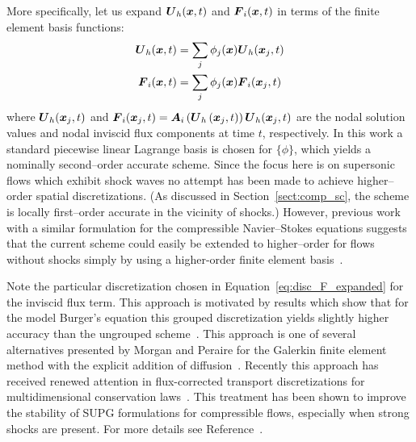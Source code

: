More specifically, let us expand ${\boldsymbol{U}}_h({\boldsymbol{x}},t)$ and ${\boldsymbol{F}}_i({\boldsymbol{x}},t)$ in terms of the finite element basis functions:
\begin{align}
  {\boldsymbol{U}}_h  ({\boldsymbol{x}},t) &= \sum_j \phi_j({\boldsymbol{x}}) {\boldsymbol{U}}_h({\boldsymbol{x}}_j,t)   \label{eq:disc_U_expanded} \\
  {\boldsymbol{F}}_i({\boldsymbol{x}},t) &= \sum_j \phi_j({\boldsymbol{x}}) {\boldsymbol{F}}_i({\boldsymbol{x}}_j,t) \label{eq:disc_F_expanded}
\end{align}
where ${\boldsymbol{U}}_h({\boldsymbol{x}}_j,t)$ and ${\boldsymbol{F}}_i({\boldsymbol{x}}_j,t)={\boldsymbol{A}}_i\left({\boldsymbol{U}}_h\left({\boldsymbol{x}}_j,t\right)\right){\boldsymbol{U}}_h({\boldsymbol{x}}_j,t)$ are the nodal solution values and nodal inviscid flux components at time $t$, respectively. In this work a standard piecewise linear Lagrange basis is chosen for $\{\phi\}$, which yields a nominally second--order accurate scheme.  Since the focus here is on supersonic flows which exhibit shock waves no attempt has been made to achieve higher--order spatial discretizations. (As discussed in Section~\ref{sect:comp_sc}, the scheme is locally first--order accurate in the vicinity of shocks.)  However, previous work with a similar formulation for the compressible Navier--Stokes equations suggests that the current scheme could easily be extended to higher--order for flows without shocks simply by using a higher-order finite element basis~\cite{bonhaus_dissertation}.

Note the particular discretization chosen in Equation~\eqref{eq:disc_F_expanded} for the inviscid flux term.  This approach is motivated by results which show that for the model Burger's equation this grouped discretization yields slightly higher accuracy than the ungrouped scheme~\cite{fletcher_group_finite_element}.  This approach is one of several alternatives presented by Morgan and Peraire for the Galerkin finite element method with the explicit addition of diffusion~\cite{morgan98unstructured}. Recently this approach has received renewed attention in flux-corrected transport discretizations for multidimensional conservation laws~\cite{KuzminMoellerTurek2003b,KuzminTurek2003c}.  This treatment has been shown to improve the stability of SUPG formulations for compressible flows, especially when strong shocks are present.  For more details see Reference~.

